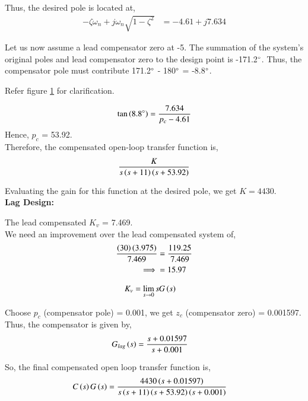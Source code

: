 \begin{enumerate}[label=\thesection.\arabic*.,ref=\thesection.\theenumi]
Thus, the desired pole is located at,
\begin{align}
    -\zeta\omega_n + j\omega_n\sqrt{1-\zeta^2} &= -4.61 + j7.634
\end{align}

Let us now assume a lead compensator zero at -5. The summation of the system's original poles and lead compensator zero to the design point is -171.2$\degree$. Thus, the compensator pole must contribute 171.2$\degree$ - 180$\degree$ = -8.8$\degree$.

\begin{figure}[!ht]
 \centering
    \resizebox{\columnwidth}{!}{}
    \caption{}
    \label{fig:ep18btech11016_graph}
\end{figure}

Refer figure \ref{fig:ep18btech11016_graph} for clarification.

\begin{align}
    \tan\left(8.8\degree\right) = \frac{7.634}{p_c - 4.61}
\end{align}
Hence, $p_c$ = 53.92.\\
Therefore, the compensated open-loop transfer function is,
\begin{align}
    \frac{K}{s\left(s+11\right)\left(s+53.92\right)}
\end{align}

Evaluating the gain for this function at the desired pole, we get $K = 4430$.\\

\textbf{Lag Design:}

The lead compensated $K_v$ = 7.469.\\
We need an improvement over the lead compensated system of,
\begin{align}
    \frac{\left(30\right)\left(3.975\right)}{7.469} &= \frac{119.25}{7.469}\\
    \implies &= 15.97
\end{align}

\begin{align}
K_v &= \lim_{s \to 0} s G\left(s\right) 
\end{align}

Choose $p_c$ (compensator pole) = 0.001, we get $z_c$ (compensator zero) = 0.001597.
Thus, the compensator is given by, 
\begin{align}
    G_{lag}\left(s\right) &= \frac{s+0.01597}{s+0.001}
\end{align}

So, the final compensated open loop transfer function is,
\begin{align}
    C\left(s\right) G\left(s\right) &= \frac{4430\left(s+0.01597\right)}{s\left(s+11\right)\left(s+53.92\right)\left(s+0.001\right)}
\end{align}


\end{enumerate}
